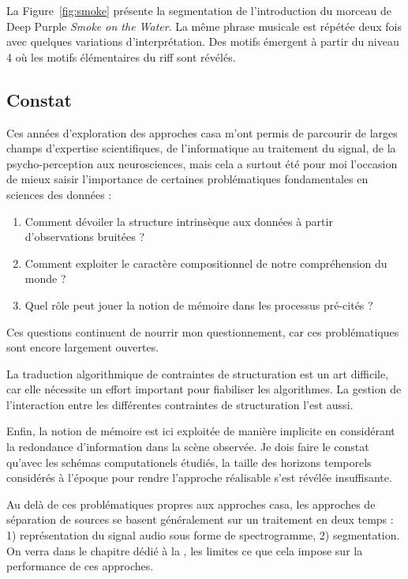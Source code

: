 La Figure~\ref{fig:smoke} présente la segmentation de l'introduction du morceau de Deep Purple \emph{Smoke on the Water}. La même phrase musicale est répétée deux fois avec quelques variations d'interprétation. Des motifs émergent à partir du niveau 4 où les motifs élémentaires du riff sont révélés.

\subsection{Constat}

Ces années d'exploration des approches casa m'ont permis de parcourir de larges champs d'expertise scientifiques, de l'informatique au traitement du signal, de la psycho-perception aux neurosciences, mais cela a surtout été pour moi l'occasion de mieux saisir l'importance de certaines problématiques fondamentales en sciences des données :
\begin{enumerate}
  \item Comment dévoiler la structure intrinsèque aux données à partir d'observations bruitées ?
  \item Comment exploiter le caractère compositionnel de notre compréhension du monde ?
  \item Quel rôle peut jouer la notion de mémoire dans les processus pré-cités ?
\end{enumerate}
Ces questions continuent de nourrir mon questionnement, car ces problématiques sont encore largement ouvertes.

La traduction algorithmique de contraintes de structuration est un art difficile, car elle nécessite un effort important pour fiabiliser les algorithmes. La gestion de l'interaction entre les différentes contraintes de structuration l'est aussi.

Enfin, la notion de mémoire est ici exploitée de manière implicite en considérant la redondance d'information dans la scène observée. Je dois faire le constat qu'avec les schémas computationels étudiés, la taille des horizons temporels considérés à l'époque pour rendre l'approche réalisable s'est révélée insuffisante.



Au delà de ces problématiques propres aux approches casa, les approches de séparation de sources se basent généralement sur un traitement en deux temps : 1) représentation du signal audio sous forme de spectrogramme, 2) segmentation. On verra dans le chapitre dédié à la , les limites ce que cela impose sur la performance de ces approches.

